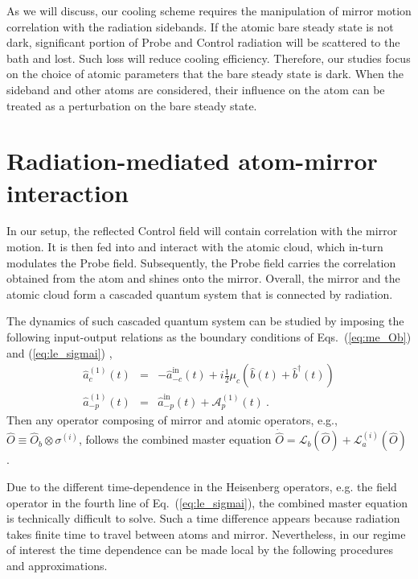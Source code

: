 \documentclass[aps, pra, reprint, amsmath, amssymb, groupedaddress, acknowledgments]{revtex4-1}
\begin{document}
As we will discuss, our cooling scheme requires the manipulation of mirror motion correlation with the radiation sidebands.  If the atomic bare steady state is not dark, significant portion of Probe and Control radiation will be scattered to the bath and lost.  Such loss will reduce cooling efficiency.  Therefore, our studies focus on the choice of atomic parameters that the bare steady state is dark.  When the sideband and other atoms are considered, their influence on the atom can be treated as a perturbation on the bare steady state.


\section{Radiation-mediated atom-mirror interaction \label{sec:cascaded}}

In our setup, the reflected Control field will contain correlation with the mirror motion.  It is then fed into and interact with the atomic cloud, which in-turn modulates the Probe field.  Subsequently, the Probe field carries the correlation obtained from the atom and shines onto the mirror.
Overall, the mirror and the atomic cloud form a cascaded quantum system that is connected by radiation.   

The dynamics of such cascaded quantum system can be studied by imposing the following input-output relations as the boundary conditions of Eqs.~(\ref{eq:me_Ob}) and (\ref{eq:le_sigmai})  \cite{book:Gardiner_Zoller},
\begin{eqnarray}
\hat{a}^{(1)}_{c}(t) &=& -\hat{a}^{\textrm{in}}_{-c}(t) + i \frac{1}{2}\mu_c \left( \hat{b}(t)+\hat{b}^\dag (t) \right)  \label{eq:io_ct} \\
\hat{a}^{(1)}_{-p}(t) &=& \hat{a}_{-p}^{\textrm{in}}(t) + \mathcal{A}_p^{(1)}(t)~. \label{eq:io_pt}
\end{eqnarray}
Then any operator composing of mirror and atomic operators, e.g., $\hat{O}\equiv \hat{O}_b \otimes \sigma^{(i)}$, follows the combined master equation $\dot{\hat{O}}=\mathcal{L}_b(\hat{O})+\mathcal{L}^{(i)}_a(\hat{O})$ \cite{book:Gardiner_Zoller}.  

Due to the different time-dependence in the Heisenberg operators, e.g. the field operator in the fourth line of Eq.~(\ref{eq:le_sigmai}), the combined master equation is technically difficult to solve.  Such a time difference appears because radiation takes finite time to travel between atoms and mirror.  Nevertheless, in our regime of interest the time dependence can be made local by the following procedures and approximations.
\end{document}

